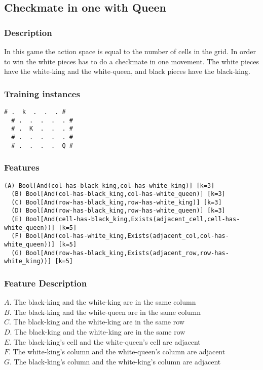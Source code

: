 \documentclass[a4paper]{article}
\begin{document}
\subsection{Checkmate in one with Queen}
\subsubsection{Description}
In this game the action space is equal to the number of cells in the grid. In order to win the white pieces has to do a checkmate in one movement. The white pieces have the white-king and the white-queen, and black pieces have the black-king.

\subsubsection{Training instances}
\begin{Verbatim}[fontsize=\footnotesize]
  # .  k  .  .  . #
  # .  .  .  .  . #
  # .  K  .  .  . #
  # .  .  .  .  . #
  # .  .  .  .  Q #
\end{Verbatim}


\subsubsection{Features}
\begin{Verbatim}[fontsize=\footnotesize]
  (A) Bool[And(col-has-black_king,col-has-white_king)] [k=3]
  (B) Bool[And(col-has-black_king,col-has-white_queen)] [k=3]
  (C) Bool[And(row-has-black_king,row-has-white_king)] [k=3]
  (D) Bool[And(row-has-black_king,row-has-white_queen)] [k=3]
  (E) Bool[And(cell-has-black_king,Exists(adjacent_cell,cell-has-white_queen))] [k=5]
  (F) Bool[And(col-has-white_king,Exists(adjacent_col,col-has-white_queen))] [k=5]
  (G) Bool[And(row-has-black_king,Exists(adjacent_row,row-has-white_king))] [k=5]
\end{Verbatim}

\subsubsection{Feature Description}
$A$. The black-king and the white-king are in the same column\\
$B$. The black-king and the white-queen are in the same column\\
$C$. The black-king and the white-king are in the same row\\
$D$. The black-king and the white-king are in the same row\\
$E$. The black-king's cell and the white-queen's cell are adjacent\\
$F$. The white-king's column and the white-queen's column are adjacent\\
$G$. The black-king's column and the white-king's column are adjacent
\end{document}
